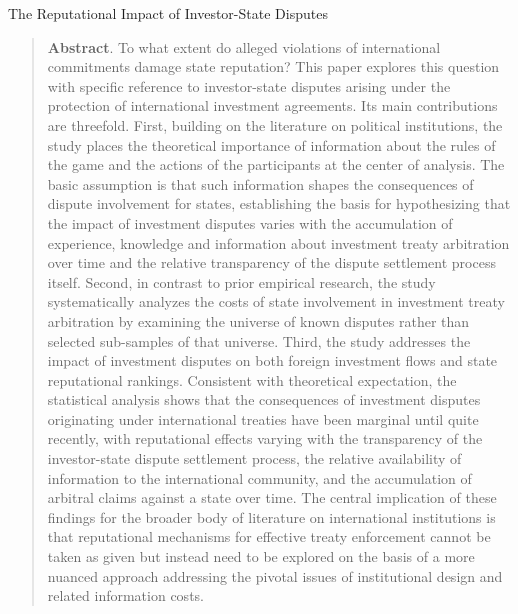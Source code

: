 \documentclass[12pt,onesided]{amsart}
\begin{document}
\thispagestyle{empty}

\begin{center}
{\sc \large The Reputational Impact of Investor-State Disputes}
\end{center}



\vspace{20mm}

\begin{quote}
\noindent \textbf{Abstract}. To what extent do alleged violations of international commitments damage state  reputation? This paper explores this question with specific reference to investor-state disputes arising under the protection  of international investment agreements. Its main contributions are threefold. First, building on the literature on political institutions, the study places the theoretical importance of information about the rules of the game and the actions of the participants at the center of analysis. The basic assumption is that such information shapes the consequences of dispute involvement for states, establishing the basis for hypothesizing that the impact of investment disputes varies with the accumulation of experience, knowledge and information about investment treaty arbitration over time and the relative transparency of the dispute settlement process itself. Second, in contrast to prior empirical research, the study systematically analyzes  the costs of state involvement in investment treaty arbitration  by examining the universe of known disputes rather than selected sub-samples of that universe.  Third, the study addresses  the impact of investment disputes on both foreign investment flows and state reputational rankings. Consistent with theoretical expectation, the statistical analysis shows that the consequences of investment disputes originating under international treaties have been marginal until quite recently, with reputational effects varying with the transparency of the investor-state dispute settlement process, the relative availability of information to the international community, and the accumulation of arbitral claims against a state over time. The  central  implication  of these  findings for the  broader  body of literature on international institutions is that  reputational mechanisms  for effective treaty  enforcement  cannot  be taken  as given but  instead  need  to be explored on the basis of a more nuanced  approach  addressing  the pivotal issues of institutional design and related  information  costs.
\end{quote}
 
\end{document}
